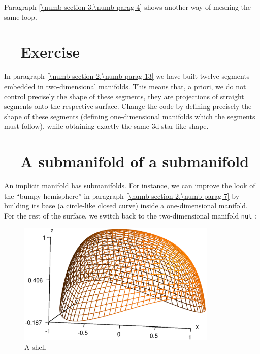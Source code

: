Paragraph \ref{\numb section 3.\numb parag 4} shows another way of meshing the same loop.


\section{~~Exercise}\label{\numb section 2.\numb parag 16}

In paragraph \ref{\numb section 2.\numb parag 13} we have built twelve segments embedded in
two-dimensional manifolds.
This means that, a priori, we do not control precisely the shape of these segments,
they are projections of straight segments onto the respective surface.
Change the code by defining precisely the shape of these segments (defining one-dimensional
manifolds which the segments must follow), while obtaining exactly the same 3d star-like shape.


\section{~~A submanifold of a submanifold}\label{\numb section 2.\numb parag 17}

An implicit manifold has submanifolds.
For instance, we can improve the look of the ``bumpy hemisphere'' in paragraph
\ref{\numb section 2.\numb parag 7} by building its base (a circle-like closed curve)
inside a one-dimensional manifold.
For the rest of the surface, we switch back to the two-dimensional manifold {\small\tt nut} :
\medskip

\begin{figure}[ht] \centering
  \includegraphics[width=95mm]{bumpy}
  \caption{A shell}
  \label{\numb section 2.\numb fig 19}
\end{figure}

